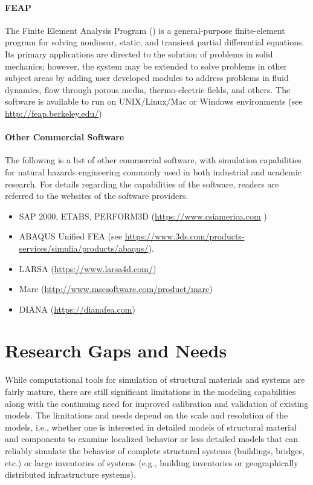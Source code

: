 \paragraph{FEAP} The Finite Element Analysis Program () is a general-purpose finite-element program for solving nonlinear, static, and transient partial differential equations. Its primary applications are directed to the solution of problems in solid mechanics; however, the system may be extended to solve problems in other subject areas by adding user developed modules to address problems in fluid dynamics, flow through porous media, thermo-electric fields, and others. The software is available to run on UNIX/Linux/Mac or Windows environments (see \url{http://feap.berkeley.edu/})

\paragraph{Other Commercial Software} The following is a list of other commercial software, with simulation capabilities for natural hazards engineering commonly used in both industrial and academic research.  For details regarding the capabilities of the software, readers are referred to the websites of the software providers.

\begin{itemize}
    \item SAP 2000, ETABS, PERFORM3D (\url{https://www.csiamerica.com} )
    \item ABAQUS Unified FEA (see \url{https://www.3ds.com/products-services/simulia/products/abaqus/}).
    \item LARSA (\url{https://www.larsa4d.com/})
    \item Marc (\url{http://www.mscsoftware.com/product/marc})
    \item DIANA (\url{https://dianafea.com})
\end{itemize}

\section{Research Gaps and Needs}
\label{sec:resp_struct_gaps}

While computational tools for simulation of structural materials and systems are fairly mature, there are still significant limitations in the modeling capabilities along with the continuing need for improved calibration and validation of existing models. The limitations and needs depend on the scale and resolution of the models, i.e., whether one is interested in detailed models of structural material and components to examine localized behavior or less detailed models that can reliably simulate the behavior of complete structural systems (buildings, bridges, etc.) or large inventories of systems (e.g., building inventories or geographically distributed infrastructure systems).

